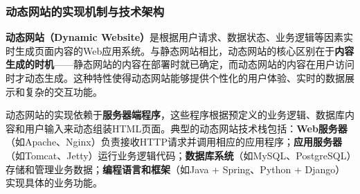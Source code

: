 \subsubsection{动态网站的实现机制与技术架构}\label{ux52a8ux6001ux7f51ux7ad9ux7684ux5b9eux73b0ux673aux5236ux4e0eux6280ux672fux67b6ux6784}

\textbf{动态网站（Dynamic Website）}是根据用户请求、数据状态、业务逻辑等因素实时生成页面内容的Web应用系统。与静态网站相比，动态网站的核心区别在于\textbf{内容生成的时机}------静态网站的内容在部署时就已确定，而动态网站的内容在用户访问时才动态生成。这种特性使得动态网站能够提供个性化的用户体验、实时的数据展示和复杂的交互功能。

动态网站的实现依赖于\textbf{服务器端程序}，这些程序根据预定义的业务逻辑、数据库内容和用户输入来动态组装HTML页面。典型的动态网站技术栈包括：\textbf{Web服务器}（如Apache、Nginx）负责接收HTTP请求并调用相应的应用程序；\textbf{应用服务器}（如Tomcat、Jetty）运行业务逻辑代码；\textbf{数据库系统}（如MySQL、PostgreSQL）存储和管理业务数据；\textbf{编程语言和框架}（如Java + Spring、Python + Django）实现具体的业务功能。

